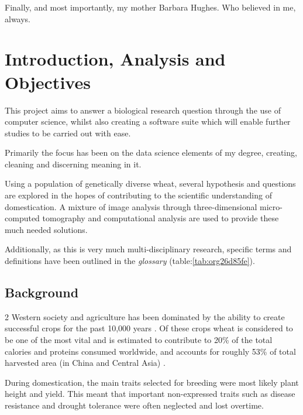 \documentclass[11pt]{report}
\begin{document}
\vspace{1cm}

Finally, and most importantly, my mother Barbara Hughes. Who believed in me, always.



  \clearpage
  \tableofcontents
  \clearpage
  \listoftables
  \clearpage
  \listoffigures
  \clearpage
  \listofmyequations
  \clearpage
  \listoflistings
  \clearpage

\chapter{Introduction, Analysis and Objectives}
\label{sec:org641ddbb}

This project aims to answer a biological research question through the use of computer science, whilst also creating a software suite which will enable further studies to be carried out with ease.

Primarily the focus has been on the data science elements of my degree, creating, cleaning and discerning meaning in it.

Using a population of genetically diverse wheat, several hypothesis and questions are explored in the hopes of contributing to the scientific understanding of domestication. A mixture of image analysis through three-dimensional micro-computed tomography and computational analysis are used to provide these much needed solutions.

Additionally, as this is very much multi-disciplinary research, specific terms and definitions have been outlined in the \emph{glossary} (table:\ref{tab:org26d85fe}).

\section{Background}
\label{sec:org2e8f343}
2
   Western society and agriculture has been dominated by the ability to create successful crops for the past 10,000 years \cite{Ozkan2002}. Of these crops wheat is considered to be one of the most vital and is estimated to contribute to 20\% of the total calories and proteins consumed worldwide, and accounts for roughly 53\% of total harvested area (in China and Central Asia) \cite{Shiferaw2013}.

During domestication, the main traits selected for breeding were most likely plant height and yield. This meant that important non-expressed traits such as disease resistance and drought tolerance were often neglected and lost overtime.
\end{document}
